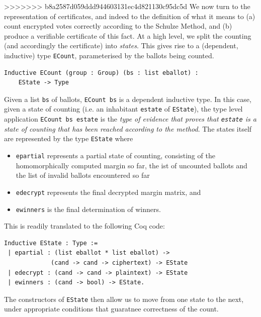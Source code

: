 \documentclass{llncs}
\begin{document}
>>>>>>> b8a2587d059ddd944603131ec4d821130c95dc5d
\fi
  \noindent
  We now turn to the representation of certificates, and indeed to the
  definition of what it means to (a) count encrypted votes correctly
  according to the Schulze Method, and (b) produce a verifiable
  certificate of this fact. At a high level, we split the counting
  (and accordingly the certificate) into \emph{states}. This gives
  rise to a (dependent, inductive) type \texttt{ECount}, parameterised
  by the ballots being counted.

  \begin{lstlisting}[frame=single,basicstyle=\ttfamily\footnotesize]
  Inductive ECount (group : Group) (bs : list eballot) : 
    EState -> Type
  \end{lstlisting}

  \noindent
  Given a list \texttt{bs} of ballots, \texttt{ECount bs} is a
  dependent inductive type. In this case, given a state of counting
  (i.e. an inhabitant \texttt{estate} of \texttt{EState}), the type level application
  \texttt{ECount bs estate} is the \emph{type of evidence that proves
  that \texttt{estate} is a state of counting that has been reached
  according to the method}.  The states itself are represented by
  the type \texttt{EState}
where
\begin{itemize}
 \item \texttt{epartial} represents a partial state of counting,
 consisting of the homomorphically computed margin so far, the ist
 of uncounted ballots and the list of invalid ballots encountered so
 far
 \item \texttt{edecrypt} represents the final decrypted margin
 matrix, and 
 \item \texttt{ewinners} is the final determination of winners. 
\end{itemize}
This is readily translated to the following Coq code:
\begin{lstlisting}[frame=single,basicstyle=\ttfamily\footnotesize]
Inductive EState : Type :=
 | epartial : (list eballot * list eballot) ->
             (cand -> cand -> ciphertext) -> EState
 | edecrypt : (cand -> cand -> plaintext) -> EState
 | ewinners : (cand -> bool) -> EState.
\end{lstlisting}


\noindent
\noindent
The constructors of \texttt{EState} then allow us to move from one
state to the next, under appropriate conditions that guaratnee
correctness of the count.
\end{document}
